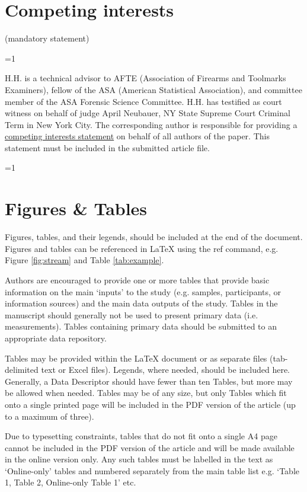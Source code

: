 \documentclass[fleqn,10pt]{wlscirep}
\newcommand{\ifinstruction}{1} %
\begin{document}
\section*{Competing interests} (mandatory statement)

\ifnum \ifinstruction=1

H.H. is a technical advisor to AFTE (Association of Firearms and
Toolmarks Examiners), fellow of the ASA (American Statistical
Association), and committee member of the ASA Forensic Science
Committee. H.H. has testified as court witness on behalf of judge April
Neubauer, NY State Supreme Court Criminal Term in New York City. \fi The
corresponding author is responsible for providing a
\href{https://www.nature.com/sdata/policies/editorial-and-publishing-policies#competing}{competing interests statement}
on behalf of all authors of the paper. This statement must be included
in the submitted article file.

\ifnum \ifinstruction=1
\section*{Figures \& Tables}


Figures, tables, and their legends, should be included at the end of the document. Figures and tables can be referenced in \LaTeX{} using the ref command, e.g. Figure \ref{fig:stream} and Table \ref{tab:example}. 

Authors are encouraged to provide one or more tables that provide basic information on the main ‘inputs’ to the study (e.g. samples, participants, or information sources) and the main data outputs of the study. Tables in the manuscript should generally not be used to present primary data (i.e. measurements). Tables containing primary data should be submitted to an appropriate data repository.

Tables may be provided within the \LaTeX{} document or as separate files (tab-delimited text or Excel files). Legends, where needed, should be included here. Generally, a Data Descriptor should have fewer than ten Tables, but more may be allowed when needed. Tables may be of any size, but only Tables which fit onto a single printed page will be included in the PDF version of the article (up to a maximum of three). 

Due to typesetting constraints, tables that do not fit onto a single A4 page cannot be included in the PDF version of the article and will be made available in the online version only. Any such tables must be labelled in the text as ‘Online-only’ tables and numbered separately from the main table list e.g. ‘Table 1, Table 2, Online-only Table 1’ etc.
\end{document}
